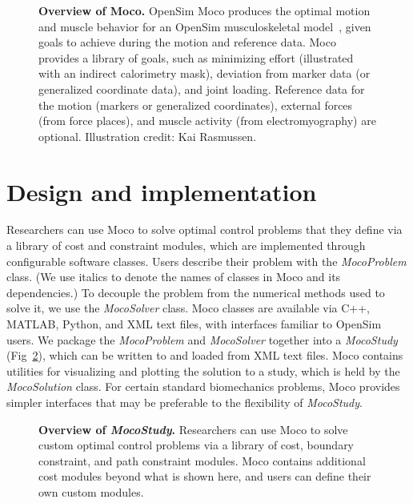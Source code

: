 \documentclass[10pt,letterpaper]{article}
\begin{document}
\begin{figure}[!h]
    \centering
    \caption{{\bf Overview of Moco.}
        OpenSim Moco produces the optimal motion and muscle behavior for an OpenSim musculoskeletal model~\cite{Seth:2018gg}, given goals to achieve during the motion and reference data. Moco provides a library of goals, such as minimizing effort (illustrated with an indirect calorimetry mask), deviation from marker data (or generalized coordinate data), and joint loading. Reference data for the motion (markers or generalized coordinates), external forces (from force places), and muscle activity (from electromyography) are optional. Illustration credit: Kai Rasmussen.}
    \label{overviewmoco}
\end{figure}

\section*{Design and implementation}

Researchers can use Moco to solve optimal control problems that they define via a library of cost and constraint modules, which are implemented through configurable software classes. Users describe their problem with the \textit{MocoProblem} class. (We use italics to denote the names of classes in Moco and its dependencies.) To decouple the problem from the numerical methods used to solve it, we use the \textit{MocoSolver} class. Moco classes are available via C++, MATLAB, Python, and XML text files, with interfaces familiar to OpenSim users. We package the \textit{MocoProblem} and \textit{MocoSolver} together into a \textit{MocoStudy} (Fig~\ref{mocodiagram}), which can be written to and loaded from XML text files. Moco contains utilities for visualizing and plotting the solution to a study, which is held by the \textit{MocoSolution} class. For certain standard biomechanics problems, Moco provides simpler interfaces that may be preferable to the flexibility of \textit{MocoStudy}.

\begin{figure}[!h]
\centering
    \caption{{\bf Overview of \textit{MocoStudy}.}
        Researchers can use Moco to solve custom optimal control problems via a library of cost, boundary constraint, and path constraint modules. Moco contains additional cost modules beyond what is shown here, and users can define their own custom modules.}
    \label{mocodiagram}
\end{figure}
\end{document}

